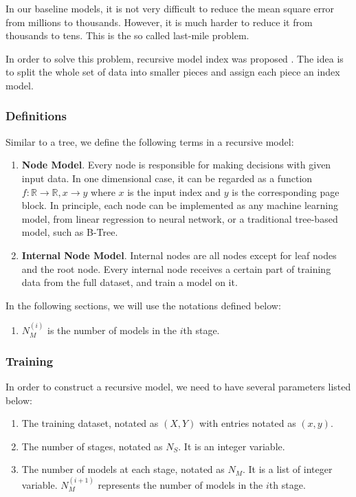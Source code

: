 
In our baseline models, it is not very difficult to reduce the mean square error from millions to thousands. However, it is much harder to reduce it from thousands to tens. This is the so called last-mile problem.

In order to solve this problem, recursive model index was proposed \cite{kraska2018case}. The idea is to split the whole set of data into smaller pieces and assign each piece an index model.

\subsubsection{Definitions}


Similar to a tree, we define the following terms in a recursive model:

\begin{enumerate}
	\item \textbf{Node Model}. Every node is responsible for making decisions with given input data. In one dimensional case, it can be regarded as a function $f:\mathbb{R}\to\mathbb{R}, x\to y$ where $x$ is the input index and $y$ is the corresponding page block. In principle, each node can be implemented as any machine learning model, from linear regression to neural network, or a traditional tree-based model, such as B-Tree.
	\item \textbf{Internal Node Model}. Internal nodes are all nodes except for leaf nodes and the root node. Every internal node receives a certain part of training data from the full dataset, and train a model on it. 
\end{enumerate}

In the following sections, we will use the notations defined below:
\begin{enumerate}
	\item $N_M^{(i)}$ is the number of models in the $i$th stage.
\end{enumerate}

\subsubsection{Training}

In order to construct a recursive model, we need to have several parameters listed below:
\begin{enumerate}
	\item The training dataset, notated as $(X, Y)$ with entries notated as $(x,y)$.
	\item The number of stages, notated as $N_S$. It is an integer variable.
	\item The number of models at each stage, notated as $N_M$. It is a list of integer variable. $N_M^{(i+1)}$ represents the number of models in the $i$th stage.
\end{enumerate}

